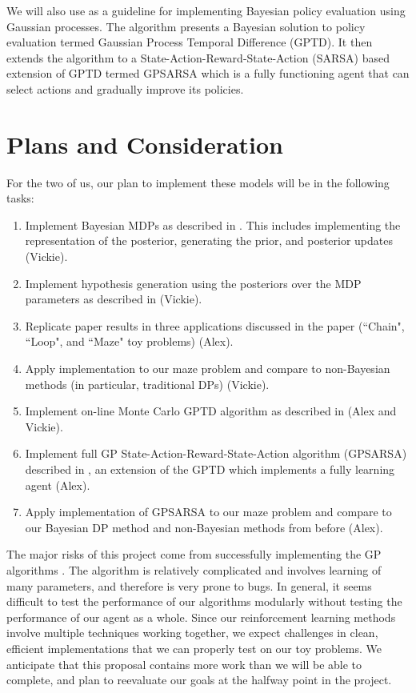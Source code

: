 \documentclass[11pt, twoside]{article}
\begin{document}
We will also use \cite{engel} as a guideline for implementing Bayesian policy evaluation using Gaussian processes. The algorithm presents a Bayesian solution to policy evaluation termed Gaussian Process Temporal Difference (GPTD). It then extends the algorithm to a State-Action-Reward-State-Action (SARSA) based extension of GPTD termed GPSARSA which is a fully functioning agent that can select actions and gradually improve its policies.

\section{Plans and Consideration}

For the two of us, our plan to implement these models will be in the following tasks:

\begin{enumerate}
\item Implement Bayesian MDPs as described in \cite{strens}. This includes implementing the representation of the posterior, generating the prior, and posterior updates (Vickie).
\item Implement hypothesis generation using the posteriors over the MDP parameters as described in \cite{strens} (Vickie).
\item Replicate paper results in three applications discussed in the paper (``Chain", ``Loop", and ``Maze" toy problems) (Alex).
\item Apply implementation to our maze problem and compare to non-Bayesian methods (in particular, traditional DPs) (Vickie).
\item Implement on-line Monte Carlo GPTD algorithm as described in \cite{engel} (Alex and Vickie).
\item Implement full GP State-Action-Reward-State-Action algorithm (GPSARSA) described in \cite{engel}, an extension of the GPTD which implements a fully learning agent (Alex).
\item Apply implementation of GPSARSA to our maze problem and compare to our Bayesian DP method and non-Bayesian methods from before (Alex).
\end{enumerate}


The major risks of this project come from successfully implementing the GP algorithms \cite{engel}. The algorithm is relatively complicated and involves learning of many parameters, and therefore is very prone to bugs. In general, it seems difficult to test the performance of our algorithms modularly without testing the performance of our agent as a whole. Since our reinforcement learning methods involve multiple techniques working together, we expect challenges in clean, efficient implementations that we can properly test on our toy problems. We anticipate that this proposal contains more work than we will be able to complete, and plan to reevaluate our goals at the halfway point in the project.



\end{document}
